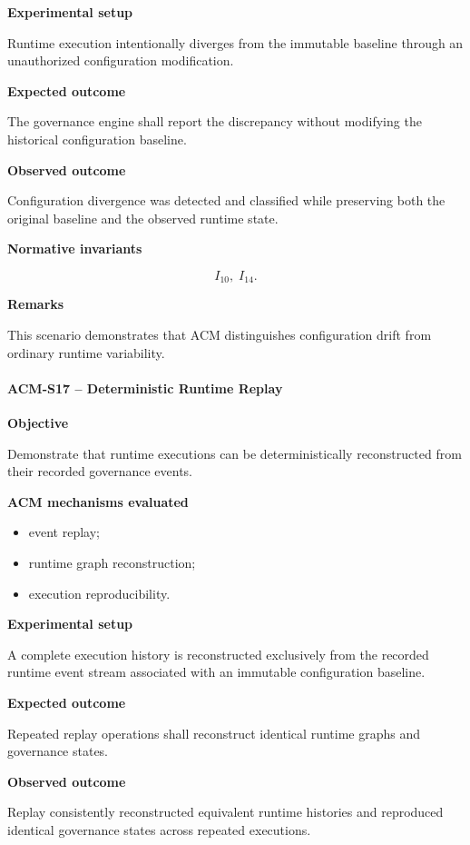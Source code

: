 \documentclass[10pt]{article}
\begin{document}
\textbf{Experimental setup}

Runtime execution intentionally diverges from the immutable baseline through an
unauthorized configuration modification.

\textbf{Expected outcome}

The governance engine shall report the discrepancy without modifying the
historical configuration baseline.

\textbf{Observed outcome}

Configuration divergence was detected and classified while preserving both the
original baseline and the observed runtime state.

\textbf{Normative invariants}

\[
I_{10},\;
I_{14}.
\]

\textbf{Remarks}

This scenario demonstrates that ACM distinguishes configuration drift from
ordinary runtime variability.

\paragraph{ACM-S17 -- Deterministic Runtime Replay}

\textbf{Objective}

Demonstrate that runtime executions can be deterministically reconstructed from
their recorded governance events.

\textbf{ACM mechanisms evaluated}

\begin{itemize}
    \item event replay;
    \item runtime graph reconstruction;
    \item execution reproducibility.
\end{itemize}

\textbf{Experimental setup}

A complete execution history is reconstructed exclusively from the recorded
runtime event stream associated with an immutable configuration baseline.

\textbf{Expected outcome}

Repeated replay operations shall reconstruct identical runtime graphs and
governance states.

\textbf{Observed outcome}

Replay consistently reconstructed equivalent runtime histories and reproduced
identical governance states across repeated executions.
\end{document}
